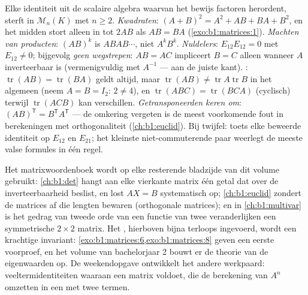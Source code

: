 \begin{remark}
\label{rem:b1:matrices:pitfalls}
Elke identiteit uit de scalaire algebra waarvan het bewijs
factoren herordent, sterft in $\mathcal{M}_n(K)$ met $n \geq 2$.
\emph{Kwadraten}: $(A + B)^2 = A^2 + AB + BA + B^2$, en het midden
stort alleen in tot $2AB$ als $AB = BA$
(\cref{exo:b1:matrices:1}).
\emph{Machten van producten}: $(AB)^k$ is $ABAB\cdots$, niet
$A^kB^k$.
\emph{Nuldelers}: $E_{12}E_{12} = 0$ met $E_{12} \neq 0$;
bijgevolg \emph{geen wegstrepen}: $AB = AC$ impliceert $B = C$
alleen wanneer $A$ inverteerbaar is (vermenigvuldig met $A^{-1}$
--- aan de juiste kant).
\emph{}: $\operatorname{tr}(AB) = \operatorname{tr}(BA)$
geldt altijd, maar $\operatorname{tr}(AB) \neq
\operatorname{tr}A\operatorname{tr}B$ in het algemeen (neem $A = B
= I_2$: $2 \neq 4$), en $\operatorname{tr}(ABC) =
\operatorname{tr}(BCA)$ (cyclisch) terwijl
$\operatorname{tr}(ACB)$ kan verschillen.
\emph{Getransponeerden keren om}: $(AB)^{\mathsf T} = B^{\mathsf
T}A^{\mathsf T}$ --- de omkering vergeten is de meest voorkomende
fout in berekeningen met orthogonaliteit (\cref{ch:b1:euclid}).
Bij twijfel: toets elke beweerde identiteit op $E_{12}$ en
$E_{21}$; het kleinste niet-commuterende paar weerlegt de meeste
valse formules in één regel.
\end{remark}

\begin{remark}
\label{rem:b1:matrices:whereused}
Het matrixwoordenboek wordt op elke resterende bladzijde van dit
volume gebruikt: \cref{ch:b1:det} hangt aan elke vierkante matrix
één getal dat over de inverteerbaarheid beslist, en lost $AX = B$
systematisch op; \cref{ch:b1:euclid} zondert de matrices af die
lengten bewaren (orthogonale matrices); en in
\cref{ch:b1:multivar} is het gedrag van tweede orde van een
functie van twee veranderlijken een symmetrische $2 \times 2$
matrix. Het , hierboven bijna terloops ingevoerd, wordt een
krachtige invariant:
\cref{exo:b1:matrices:6,exo:b1:matrices:8} geven een eerste
voorproef, en het volume van bachelorjaar 2 bouwt er de theorie
van de eigenwaarden op. De weekendopgave ontwikkelt het andere
werkpaard: veeltermidentiteiten waaraan een matrix voldoet, die de
berekening van $A^n$ omzetten in een  met twee
termen.
\end{remark}

